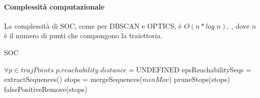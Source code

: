\documentclass[12pt]{article}
\begin{document}
\paragraph{Complessità computazionale} La complessità di SOC, come per DBSCAN e OPTICS, è $O(n*log\;n)$, , dove $n$ è il numero di punti che compongono la traiettoria.

\begin{algorithm}
    \caption{SOC}\label{SOC}
    $\forall p \in trajPoints\;p.reachability\;distance = \mathrm{UNDEFINED}$\;
    epsReachabilitySeqs = extractSequences()\;
    stops = mergeSequences($minMov$)\;
    pruneStops(stops)\;
    falsePositiveRemove(stops)\;
\end{algorithm}
\end{document}
